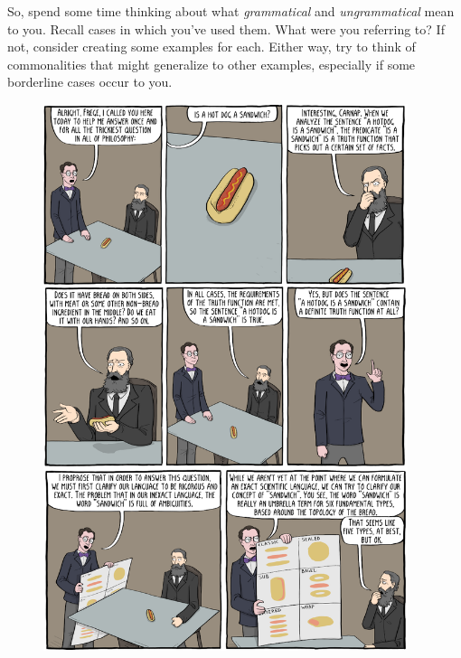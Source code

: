 So, spend some time thinking about what \textit{grammatical} and \textit{ungrammatical} mean to you. Recall cases in which you've used them. What were you referring to? If not, consider creating some examples for each. Either way, try to think of commonalities that might generalize to other examples, especially if some borderline cases occur to you.

\begin{figure}
\centering
\includegraphics[width=0.95\textwidth]{figures/hotdogSandwich1.png}
\end{figure}

